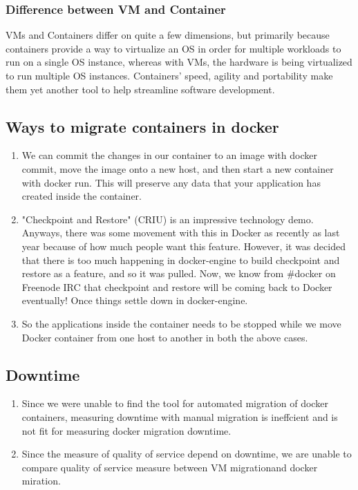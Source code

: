 \documentclass[a4paper,12pt]{article}
\begin{document}
\subsubsection{Difference between VM and Container}
VMs and Containers differ on quite a few dimensions, but primarily because containers provide a way to virtualize an OS in order for multiple workloads to run on a single OS instance, whereas with VMs, the hardware is being virtualized to run multiple OS instances. Containers’ speed, agility and portability make them yet another tool to help streamline software development.

\subsection{Ways to migrate containers in docker}
\begin{enumerate}
  \item We can commit the changes in our container to an image with docker commit, move the image onto a new host, and then start a new container with docker run. This will preserve any data that your application has created inside the container.
  \item "Checkpoint and Restore" (CRIU) is an impressive technology demo. Anyways, there was some movement with this in Docker as recently as last year because of how much people want this feature. However, it was decided that there is too much happening in docker-engine to build checkpoint and restore as a feature, and so it was pulled. Now, we know from \#docker on Freenode IRC that checkpoint and restore will be coming back to Docker eventually! Once things settle down in docker-engine.\cite{hvo}
  \item So the applications inside the container needs to be stopped while we move Docker container from one host to another in both the above cases.
\end{enumerate}

\subsection{Downtime}
\begin{enumerate}

\item Since we were unable to find the tool for automated migration of docker containers, measuring downtime with manual migration is ineffcient and is not fit for measuring docker migration downtime. 

\item Since the measure of quality of service depend on downtime, we are unable to compare quality of service measure between VM migrationand docker miration.
\end{enumerate}
\end{document}
